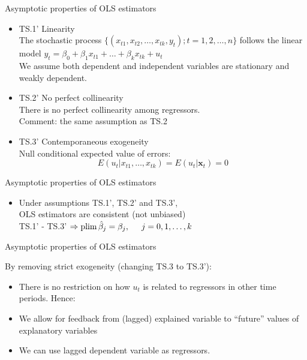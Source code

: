 \documentclass{beamer}
\begin{document}

\begin{frame}{Asymptotic properties of OLS estimators}
\begin{itemize}
\item TS.1' Linearity \\The stochastic process 
$\{(x_{t1},x_{t2},\dots,x_{tk},y_t);t=1,2,\dots, n\}$ follows the linear model $ y_t = \beta_0 + \beta_1 x_{t1} + \dots + \beta_k x_{tk}+u_t$ 
\\ We assume both dependent and independent variables are stationary and weakly dependent.
\vspace{0.5cm}
\item TS.2' No perfect collinearity \\
There is no perfect collinearity among regressors. \\
{\footnotesize Comment: the same assumption as TS.2}
\vspace{0.5cm}
\item TS.3' Contemporaneous exogeneity 
\\Null conditional expected value of errors: 
$$E(u_t|x_{t1},\dots,x_{tk})=E(u_t|\boldsymbol{x}_t)=0$$
\end{itemize}
\end{frame}


\begin{frame}{Asymptotic properties of OLS estimators}
\begin{itemize}
\item Under assumptions TS.1', TS.2' and TS.3', \\OLS estimators are consistent (not unbiased)\\
\vspace{0.5cm}
TS.1' - TS.3' $\Rightarrow \textnormal{plim}\,\hat{\beta}_j = \beta_j, \hspace{0.5cm} j=0, 1, \dots, k$
\end{itemize}
\end{frame}


\begin{frame}{Asymptotic properties of OLS estimators}

By removing strict exogeneity (changing TS.3 to TS.3'):
\vspace{0.5cm}
\begin{itemize}
\item There is no restriction on how $u_t$ is related to regressors in other time periods. Hence: 
\vspace{0.5cm}

\item We allow for feedback from (lagged) explained variable to ``future'' values of explanatory variables 
\vspace{0.5cm}

\item We can use lagged dependent variable as regressors.
\end{itemize}

\end{frame}
\end{document}
